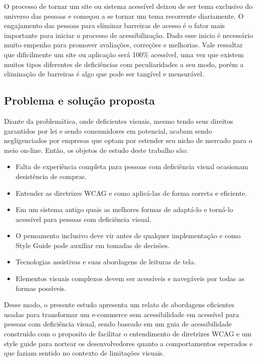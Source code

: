 {{O processo de tornar um site ou sistema acessível deixou de ser tema exclusivo do universo das pessoas e começou a se tornar um tema recorrente diariamente. O engajamento das pessoas para eliminar barreiras de acesso é o fator mais importante para iniciar o processo de acessibilização. Dado esse inicio é necessário muito empenho para promover avaliações, correções e melhorias. Vale ressaltar que dificilmente um site ou aplicação será 100\% acessível, uma vez que existem muitos tipos diferentes de deficiências com peculiaridades a seu modo, porém a eliminação de barreiras é algo que pode ser tangível e mensurável. 
 }


}
\subsection{Problema e solução proposta}
{Diante da problemática, onde deficientes visuais, mesmo tendo seus direitos garantidos por lei \cite{brasil2015} e sendo consumidores em potencial, acabam sendo negligenciados por empresas que optam por estender seu nicho de mercado para o  meio on-line. Então, os objetos de estudo deste trabalho são: 
\begin{itemize}
    \item Falta de experiência completa para pessoas com deficiência visual ocasionam desistência de compras. 
    \item Entender as diretrizes WCAG \cite{WCAG} e como aplicá-las de forma correta e eficiente.
    \item Em um sistema antigo quais as melhores formas de adaptá-lo e torná-lo acessível para pessoas com deficiência visual. 
    \item O pensamento inclusivo deve vir antes de qualquer implementação e como Style Guide \cite{STYLE} pode auxiliar em tomadas de decisões.
    \item Tecnologias assistivas e suas abordagens de leituras de tela.
    \item Elementos visuais complexos devem ser acessíveis e navegáveis por todas as formas possíveis. 

\end{itemize}
 
 Desse modo, o presente estudo apresenta um relato de abordagens eficientes usadas para transformar um e-commerce sem acessibilidade em acessível para pessoas com deficiência visual, sendo baseado em um guia de acessibilidade construído com o proposito de facilitar o entendimento de diretrizes WCAG e um style guide para nortear os desenvolvedores quanto a comportamentos esperados e que faziam sentido no contexto de limitações visuais. 
}
